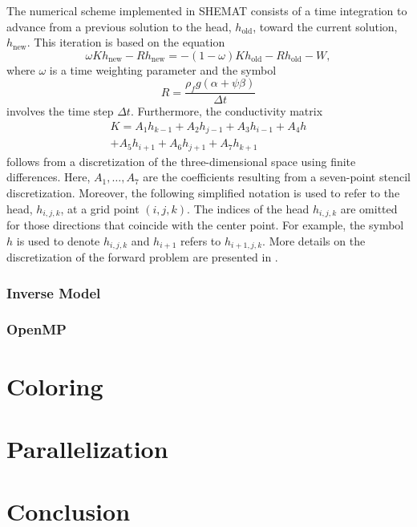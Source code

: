 \documentclass[12pt, oneside]{book}
\begin{document}
The numerical scheme implemented in SHEMAT consists of a time integration to advance from a
previous solution to the head, $h_{\text{old}}$, toward the current solution, $h_{\text{new}}$.
This iteration is based on the equation
\begin{equation*}
\omega K  h_{\text{new}} - R  h_{\text{new}} =
-(1-\omega)K h_{\text{old}} - R h_{\text{old}} - W  ,
\end{equation*}
where $\omega$ is a time weighting parameter and the symbol
$$
R=\frac{\rho_f g (\alpha+\psi\beta)}{\Delta t}
$$
involves the time step $\Delta t$. Furthermore, the conductivity matrix
\begin{multline*}
K = A_1 h_{k-1} + A_2 h_{j-1} + A_3 h_{i-1} + A_4 h \\+ A_5 h_{i+1} + A_6 h_{j+1} + A_7 h_{k+1}
\end{multline*}
follows from a discretization of the three-dimensional space using finite differences. Here, $A_1,
\dots, A_7$ are the coefficients resulting from a seven-point stencil discretization. Moreover, the
following simplified notation is used to refer to the head, $h_{i,j,k}$, at a grid point $(i,j,k)$.
The indices of the head $h_{i,j,k}$ are omitted for those directions that coincide with the center
point. For example, the symbol $h$ is used to denote $h_{i,j,k}$ and $h_{i+1}$ refers to
$h_{i+1,j,k}$. More details on the discretization of the forward problem are presented in
\cite{shemat}.
\subsection{Inverse Model}
\subsection{OpenMP}
\chapter{Coloring}
\chapter{Parallelization}
\chapter{Conclusion}
 


\end{document}
